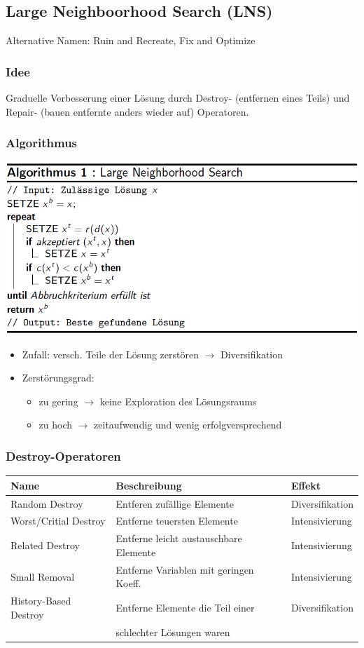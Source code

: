 \documentclass[12pt]{article}
\begin{document}
		\subsection{Large Neighboorhood Search (LNS)}
		Alternative Namen: Ruin and Recreate, Fix and Optimize
		\subsubsection{Idee}
			Graduelle Verbesserung einer Lösung durch Destroy- (entfernen eines Teils) und Repair- (bauen entfernte anders wieder auf) Operatoren.
			
		\subsubsection{Algorithmus}
			\includegraphics[scale=0.6]{LNS}
			\begin{itemize}
				\item Zufall: versch. Teile der Lösung zerstören $\rightarrow$ Diversifikation
				\item Zerstörungsgrad:
					\begin{itemize}
						\item zu gering $\rightarrow$ keine Exploration des Lösungsraums
						\item zu hoch $\rightarrow$ zeitaufwendig und wenig erfolgversprechend
					\end{itemize}
			\end{itemize}
		\subsubsection{Destroy-Operatoren}
			\begin{tabular}{l l l}
				Name & Beschreibung & Effekt \\ \hline
				Random Destroy & Entferen zufällige Elemente & Diversifikation \\
				Worst/Critial Destroy & Entferne teuersten Elemente & Intensivierung \\
				Related Destroy & Entferne leicht austauschbare Elemente & Intensivierung \\
				Small Removal & Entferne Variablen mit geringen Koeff. & Intensivierung \\
				History-Based Destroy & Entferne Elemente die Teil einer & Diversifikation\\
				& schlechter Lösungen waren & 				
			\end{tabular}
\end{document}
